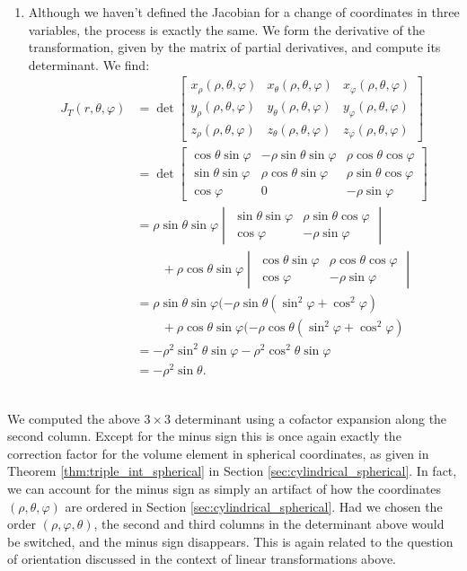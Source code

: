 {\begin{enumerate}
\item Although we haven't defined the Jacobian for a change of coordinates in three variables, the process is exactly the same. We form the derivative of the transformation, given by the matrix of partial derivatives, and compute its determinant. We find:
\begin{align*}
J_T(r,\theta,\varphi) &= \det\begin{bmatrix} 
x_\rho(\rho,\theta,\varphi) & x_\theta(\rho,\theta,\varphi) & x_\varphi(\rho,\theta,\varphi)\\
y_\rho(\rho,\theta,\varphi) & y_\theta(\rho,\theta,\varphi) & y_\varphi(\rho,\theta,\varphi)\\
z_\rho(\rho,\theta,\varphi) & z_\theta(\rho,\theta,\varphi) & z_\varphi(\rho,\theta,\varphi)\end{bmatrix}\\
& = \det\begin{bmatrix}
\cos\theta\sin\varphi & -\rho\sin\theta\sin\varphi & \rho\cos\theta\cos\varphi\\
\sin\theta\sin\varphi & \rho\cos\theta\sin\varphi & \rho\sin\theta\cos\varphi\\
\cos\varphi & 0 & -\rho\sin\varphi\end{bmatrix}\\
& = \rho\sin\theta\sin\varphi\begin{vmatrix}
\sin\theta\sin\varphi & \rho\sin\theta\cos\varphi\\
\cos\varphi & -\rho\sin\varphi
\end{vmatrix}\\
&\quad\quad + \rho\cos\theta\sin\varphi\begin{vmatrix}
\cos\theta\sin\varphi & \rho\cos\theta\cos\varphi\\
\cos\varphi &-\rho\sin\varphi
\end{vmatrix}\\
&=\rho\sin\theta\sin\varphi(-\rho\sin\theta(\sin^2\varphi+\cos^2\varphi)\\
&\quad\quad+\rho\cos\theta\sin\varphi(-\rho\cos\theta(\sin^2\varphi+\cos^2\varphi)\\
&=-\rho^2\sin^2\theta\sin\varphi-\rho^2\cos^2\theta\sin\varphi\\
&=-\rho^2\sin\theta.
\end{align*}

\end{enumerate}
\baselineskip}\\

We computed the above $3\times 3$ determinant using a cofactor expansion along the second column. Except for the minus sign this is once again exactly the correction factor for the volume element in spherical coordinates, as given in Theorem \ref{thm:triple_int_spherical} in Section \ref{sec:cylindrical_spherical}. In fact, we can account for the minus sign as simply an artifact of how the coordinates $(\rho,\theta,\varphi)$ are ordered in Section \ref{sec:cylindrical_spherical}. Had we chosen the order $(\rho,\varphi,\theta)$, the second and third columns in the determinant above would be switched, and the minus sign disappears. This is again related to the question of orientation discussed in the context of linear transformations above.

